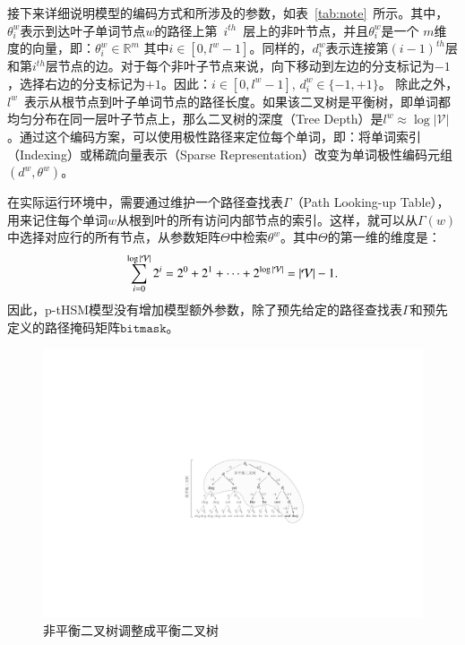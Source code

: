 接下来详细说明模型的编码方式和所涉及的参数，如表~\ref{tab:note}~所示。其中，$\theta_i^w $表示到达叶子单词节点$w$的路径上第~$i^{th}$~层上的非叶节点，并且$\theta_i ^ w$是一个 $m$维度的向量，即：$\theta_i^w \in\mathbb{R}^m $ 其中$ i \in [0, l^w-1] $。同样的，$ d_i^w $表示连接第$(i-1)^{th}$层和第$i^{th}$层节点的边。对于每个非叶子节点来说，向下移动到左边的分支标记为$ -1 $，选择右边的分支标记为$ + 1 $。因此：$i\in[0,l^w-1]$, $d_i^w\in \{-1,+1\}$。 除此之外， $l^w$~表示从根节点到叶子单词节点的路径长度。如果该二叉树是平衡树，即单词都均匀分布在同一层叶子节点上，那么二叉树的深度（Tree Depth）是$l^w\approx \log \mathcal{|V|}$ 。通过这个编码方案，可以使用极性路径来定位每个单词，即：将单词索引（Indexing）或稀疏向量表示（Sparse Representation）改变为单词极性编码元组$(d^w,\theta^w)$。



在实际运行环境中，需要通过维护一个路径查找表$\Gamma$（Path Looking-up Table），用来记住每个单词$ w $从根到叶的所有访问内部节点的索引。这样，就可以从$ \Gamma(w)$中选择对应行的所有节点，从参数矩阵${\Theta} $中检索$ \theta ^ w $。其中${\Theta} $的第一维的维度是：
\begin{equation}\label{equ:sums}
\setlength{\abovedisplayskip}{10pt}
\setlength{\belowdisplayskip}{10pt}
\sum_{i=0}^{\log \mathcal{|V|}}{2^i} =2^0+2^1+\cdots+2^{\log \mathcal{|V|}}= \mathcal{|V|} -1.
\end{equation}
因此，p-tHSM模型没有增加模型额外参数，除了预先给定的路径查找表$\Gamma$和预先定义的路径掩码矩阵$\mathtt{bitmask}$。


\begin{figure}[!t]
  \centering
\includegraphics[width=0.85\linewidth]{./figures/thsm-example-mask.pdf}
\caption{非平衡二叉树调整成平衡二叉树}\label{fig:case_thsm_mask}
\end{figure}




